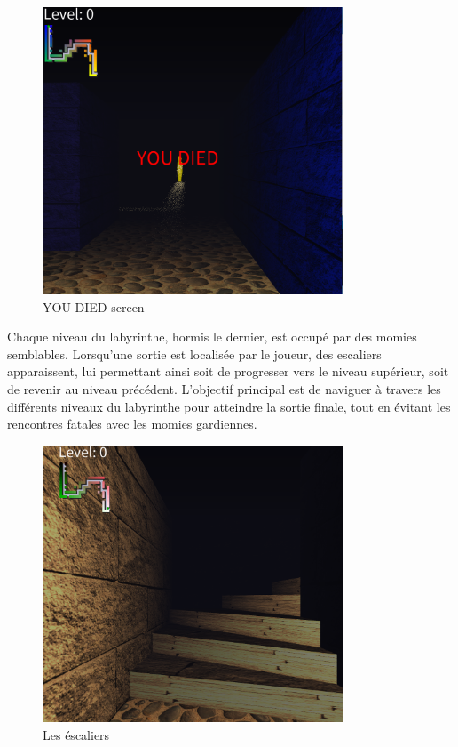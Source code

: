 \documentclass[12pt,oneside,letterpaper]{article}
\begin{document}
\begin{figure}[H]
    \centering
    \includegraphics[width=0.8\textwidth]{figures/you-died.png}
    \caption{YOU DIED screen}
\end{figure}

Chaque niveau du labyrinthe, hormis le dernier, est occupé par des momies
semblables. Lorsqu’une sortie est localisée par le joueur, des escaliers
apparaissent, lui permettant ainsi soit de progresser vers le niveau supérieur,
soit de revenir au niveau précédent. L'objectif principal est de naviguer à
travers les différents niveaux du labyrinthe pour atteindre la sortie finale,
tout en évitant les rencontres fatales avec les momies gardiennes.
\begin{figure}[H]
    \centering
    \includegraphics[width=0.8\textwidth]{figures/stairs.png}
    \caption{Les éscaliers}
\end{figure}
\end{document}
